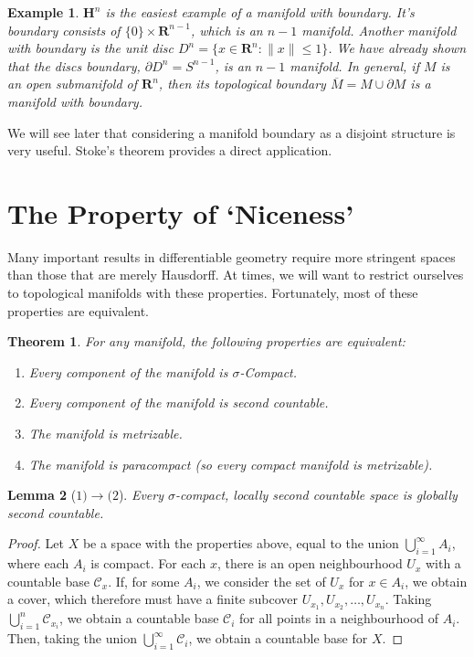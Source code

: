 \documentclass[12pt]{report}
\theoremstyle{plain}
\newtheorem{theorem}{Theorem}[chapter]
\newtheorem{lemma}[theorem]{Lemma}
\newtheorem*{example}{Example}
\theoremstyle{definition}
\begin{document}
\begin{example}
    $\mathbf{H}^n$ is the easiest example of a manifold with boundary. It's boundary consists of $\{ 0 \} \times \mathbf{R}^{n-1}$, which is an $n - 1$ manifold. Another manifold with boundary is the unit disc $D^n = \{ x \in \mathbf{R}^n : \|x\| \leq 1 \}$. We have already shown that the discs boundary, $\partial D^n = S^{n-1}$, is an $n - 1$ manifold. In general, if $M$ is an open submanifold of $\mathbf{R}^n$, then its topological boundary $\overline{M} = M \cup \partial M$ is a manifold with boundary.
\end{example}

We will see later that considering a manifold boundary as a disjoint structure is very useful. Stoke's theorem provides a direct application.

\section{The Property of `Niceness'}

Many important results in differentiable geometry require more stringent spaces than those that are merely Hausdorff. At times, we will want to restrict ourselves to topological manifolds with these properties. Fortunately, most of these properties are equivalent.

\begin{theorem}
    For any manifold, the following properties are equivalent:
    \begin{enumerate}
        \item Every component of the manifold is $\sigma$-Compact.
        \item Every component of the manifold is second countable.
        \item The manifold is metrizable.
        \item The manifold is paracompact (so every compact manifold is metrizable).
    \end{enumerate}
\end{theorem}

\begin{lemma}[$1) \to (2$]
    Every $\sigma$-compact, locally second countable space is globally second countable.
\end{lemma}
\begin{proof}
    Let $X$ be a space with the properties above, equal to the union $\bigcup_{i = 1}^\infty A_i$, where each $A_i$ is compact. For each $x$, there is an open neighbourhood $U_x$ with a countable base $\mathcal{C}_x$. If, for some $A_i$, we consider the set of $U_x$ for $x \in A_i$, we obtain a cover, which therefore must have a finite subcover $U_{x_1}, U_{x_2}, \dots, U_{x_n}$. Taking $\bigcup_{i = 1}^n \mathcal{C}_{x_i}$, we obtain a countable base $\mathcal{C}_i$ for all points in a neighbourhood of $A_i$. Then, taking the union $\bigcup_{i = 1}^\infty \mathcal{C}_i$, we obtain a countable base for $X$.
\end{proof}
\end{document}
